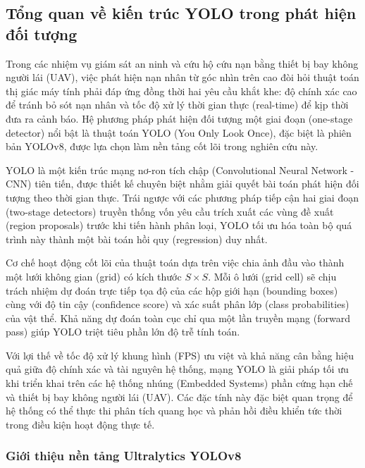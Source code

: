 
\subsection{Tổng quan về kiến trúc YOLO trong phát hiện đối tượng}


Trong các nhiệm vụ giám sát an ninh và cứu hộ cứu nạn bằng thiết bị bay không người lái (UAV), việc phát hiện nạn nhân từ góc nhìn trên cao đòi hỏi thuật toán thị giác máy tính phải đáp ứng đồng thời hai yêu cầu khắt khe: độ chính xác cao để tránh bỏ sót nạn nhân và tốc độ xử lý thời gian thực (real-time) để kịp thời đưa ra cảnh báo. Hệ phương pháp phát hiện đối tượng một giai đoạn (one-stage detector) nổi bật là thuật toán YOLO (You Only Look Once), đặc biệt là phiên bản YOLOv8, được lựa chọn làm nền tảng cốt lõi trong nghiên cứu này.

YOLO là một kiến trúc mạng nơ-ron tích chập (Convolutional Neural Network - CNN) tiên tiến, được thiết kế chuyên biệt nhằm giải quyết bài toán phát hiện đối tượng theo thời gian thực. Trái ngược với các phương pháp tiếp cận hai giai đoạn (two-stage detectors) truyền thống vốn yêu cầu trích xuất các vùng đề xuất (region proposals) trước khi tiến hành phân loại, YOLO tối ưu hóa toàn bộ quá trình này thành một bài toán hồi quy (regression) duy nhất.

Cơ chế hoạt động cốt lõi của thuật toán dựa trên việc chia ảnh đầu vào thành một lưới không gian (grid) có kích thước $S \times S$. Mỗi ô lưới (grid cell) sẽ chịu trách nhiệm dự đoán trực tiếp tọa độ của các hộp giới hạn (bounding boxes) cùng với độ tin cậy (confidence score) và xác suất phân lớp (class probabilities) của vật thể. Khả năng dự đoán toàn cục chỉ qua một lần truyền mạng (forward pass) giúp YOLO triệt tiêu phần lớn độ trễ tính toán.

Với lợi thế về tốc độ xử lý khung hình (FPS) ưu việt và khả năng cân bằng hiệu quả giữa độ chính xác và tài nguyên hệ thống, mạng YOLO là giải pháp tối ưu khi triển khai trên các hệ thống nhúng (Embedded Systems) phần cứng hạn chế và thiết bị bay không người lái (UAV). Các đặc tính này đặc biệt quan trọng để hệ thống có thể thực thi phân tích quang học và phản hồi điều khiển tức thời trong điều kiện hoạt động thực tế.

\subsubsection{Giới thiệu nền tảng Ultralytics YOLOv8}

